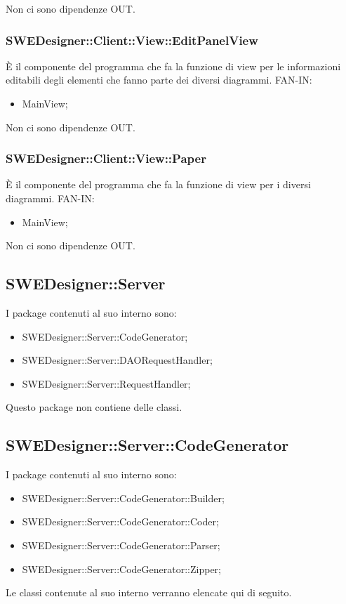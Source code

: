 \documentclass[../PianoDiQualifica.tex]{subfiles}
\begin{document}
		Non ci sono dipendenze OUT.\subsubsection{SWEDesigner::Client::View::EditPanelView}
		È il componente del programma che fa la funzione di view per le informazioni editabili degli elementi che fanno parte dei diversi diagrammi.
		FAN-IN:
		\begin{itemize}
			\item MainView;
		\end{itemize}
		Non ci sono dipendenze OUT.\subsubsection{SWEDesigner::Client::View::Paper}
		È il componente del programma che fa la funzione di view per i diversi diagrammi.
		FAN-IN:
		\begin{itemize}
			\item MainView;
		\end{itemize}
		Non ci sono dipendenze OUT.\subsection{SWEDesigner::Server}
		I package contenuti al suo interno sono:
		\begin{itemize}
			\item SWEDesigner::Server::CodeGenerator;
			\item SWEDesigner::Server::DAORequestHandler;
			\item SWEDesigner::Server::RequestHandler;
		\end{itemize}
		Questo package non contiene delle classi.
		\subsection{SWEDesigner::Server::CodeGenerator}
		I package contenuti al suo interno sono:
		\begin{itemize}
			\item SWEDesigner::Server::CodeGenerator::Builder;
			\item SWEDesigner::Server::CodeGenerator::Coder;
			\item SWEDesigner::Server::CodeGenerator::Parser;
			\item SWEDesigner::Server::CodeGenerator::Zipper;
		\end{itemize}
		Le classi contenute al suo interno verranno elencate qui di seguito.
\end{document}
